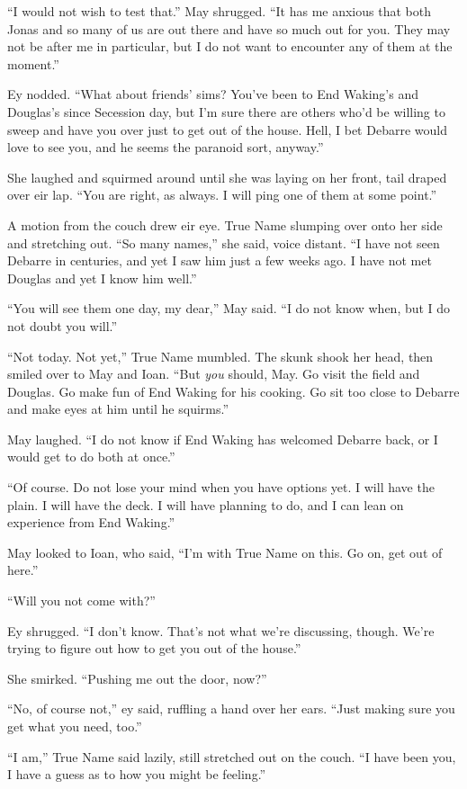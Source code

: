 ``I would not wish to test that.'' May shrugged. ``It has me anxious that both Jonas and so many of us are out there and have so much out for you. They may not be after me in particular, but I do not want to encounter any of them at the moment.''

Ey nodded. ``What about friends' sims? You've been to End Waking's and Douglas's since Secession day, but I'm sure there are others who'd be willing to sweep and have you over just to get out of the house. Hell, I bet Debarre would love to see you, and he seems the paranoid sort, anyway.''

She laughed and squirmed around until she was laying on her front, tail draped over eir lap. ``You are right, as always. I will ping one of them at some point.''

A motion from the couch drew eir eye. True Name slumping over onto her side and stretching out. ``So many names,'' she said, voice distant. ``I have not seen Debarre in centuries, and yet I saw him just a few weeks ago. I have not met Douglas and yet I know him well.''

``You will see them one day, my dear,'' May said. ``I do not know when, but I do not doubt you will.''

``Not today. Not yet,'' True Name mumbled. The skunk shook her head, then smiled over to May and Ioan. ``But \emph{you} should, May. Go visit the field and Douglas. Go make fun of End Waking for his cooking. Go sit too close to Debarre and make eyes at him until he squirms.''

May laughed. ``I do not know if End Waking has welcomed Debarre back, or I would get to do both at once.''

``Of course. Do not lose your mind when you have options yet. I will have the plain. I will have the deck. I will have planning to do, and I can lean on experience from End Waking.''

May looked to Ioan, who said, ``I'm with True Name on this. Go on, get out of here.''

``Will you not come with?''

Ey shrugged. ``I don't know. That's not what we're discussing, though. We're trying to figure out how to get you out of the house.''

She smirked. ``Pushing me out the door, now?''

``No, of course not,'' ey said, ruffling a hand over her ears. ``Just making sure you get what you need, too.''

``I am,'' True Name said lazily, still stretched out on the couch. ``I have been you, I have a guess as to how you might be feeling.''

